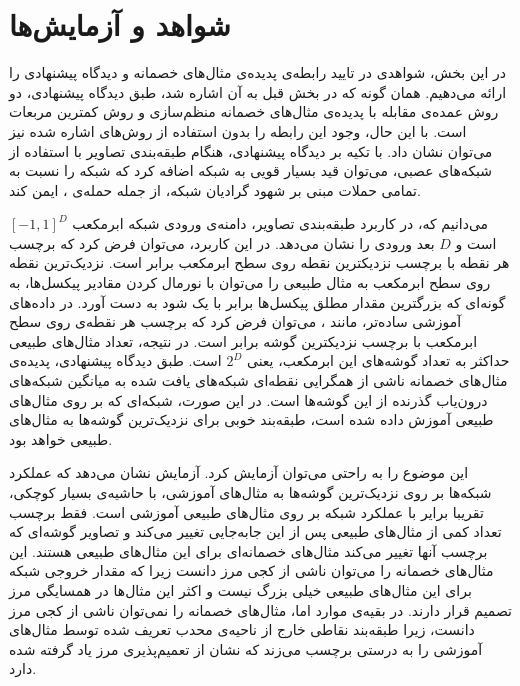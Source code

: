\documentclass[12pt,onecolumn,a4paper]{article}
\begin{document}
\section{شواهد و آزمایش‌ها}
در این بخش، شواهدی در تایید رابطه‌ی پدیده‌ی مثال‌های خصمانه و دیدگاه پیشنهادی را ارائه می‌دهیم. همان گونه که در بخش قبل به آن اشاره شد، طبق دیدگاه پیشنهادی، دو روش عمده‌ی مقابله با پدیده‌ی مثال‌های خصمانه منظم‌سازی و روش کمترین مربعات است. با این  حال، وجود این رابطه را بدون استفاده از روش‌های اشاره شده نیز می‌توان نشان داد. با تکیه بر دیدگاه پیشنهادی، هنگام طبقه‌بندی تصاویر با استفاده از شبکه‌های عصبی، می‌توان قید بسیار قویی به شبکه اضافه کرد که شبکه را نسبت به تمامی حملات مبنی بر شهود گرادیان  شبکه، از جمله حمله‌ی ، ایمن کند.

می‌دانیم که، در کاربرد طبقه‌بندی تصاویر، دامنه‌ی ورودی شبکه ابرمکعب $[-1,1]^D$ است و $D$ بعد ورودی را نشان می‌دهد. در این کاربرد، می‌توان فرض کرد که برچسب هر نقطه با برچسب نزدیکترین نقطه روی سطح ابرمکعب برابر است. نزدیک‌ترین نقطه روی سطح ابرمکعب به مثال طبیعی را می‌توان با نورمال کردن مقادیر پیکسل‌ها، به گونه‌ای که بزرگترین مقدار مطلق پیکسل‌ها برابر با یک شود به دست آورد. در داده‌های آموزشی ساده‌تر، مانند 
، 
می‌توان فرض کرد که برچسب هر نقطه‌ی روی سطح ابرمکعب با برچسب نزدیکترین گوشه برابر است. در نتیجه، تعداد مثال‌های طبیعی حداکثر به تعداد گوشه‌های این ابرمکعب، یعنی $2^D$ است. طبق دیدگاه پیشنهادی، پدیده‌ی مثال‌های خصمانه ناشی از همگرایی نقطه‌ای شبکه‌ها‌ی یافت شده به میانگین شبکه‌های درون‌یاب گذرنده از این گوشه‌ها است. در این صورت، شبکه‌ای که بر روی مثال‌های طبیعی آموزش داده شده است،  طبقه‌بند خوبی برای نزدیک‌ترین گوشه‌ها به مثال‌های طبیعی خواهد بود. 

 این موضوع را به راحتی می‌توان آزمایش کرد. آزمایش نشان می‌دهد که عملکرد شبکه‌ها بر روی نزدیک‌ترین گوشه‌ها به مثال‌های آموزشی، با حاشیه‌ی بسیار کوچکی، تقریبا برایر با عملکرد شبکه بر روی مثال‌های طبیعی آموزشی است. فقط برچسب تعداد کمی از مثال‌های طبیعی پس از این جابه‌جایی تغییر می‌کند و تصاویر گوشه‌ای که برچسب آنها تغییر می‌کند مثال‌های خصمانه‌ای برای این مثال‌های طبیعی هستند. این مثال‌های خصمانه را می‌توان ناشی از کجی مرز دانست زیرا که مقدار خروجی شبکه برای این مثال‌های طبیعی خیلی بزرگ نیست و اکثر این مثال‌ها در همسایگی مرز تصمیم قرار دارند. در بقیه‌ی موارد اما، مثال‌های خصمانه را نمی‌توان ناشی از کجی مرز دانست، زیرا طبقه‌بند نقاطی خارج از ناحیه‌ی محدب تعریف شده توسط مثال‌های آموزشی را به درستی برچسب می‌زند که نشان از تعمیم‌پذیری مرز یاد گرفته شده دارد.
\end{document}
